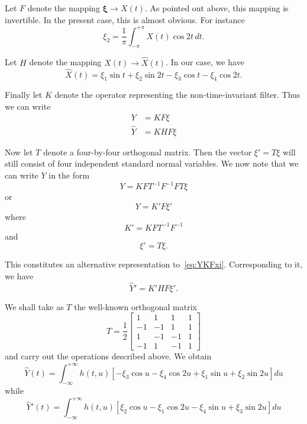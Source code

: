 \documentclass{article}
\begin{document}
Let $F$ denote the mapping $\boldsymbol{\xi} \rightarrow X(t)$. As pointed out above, this mapping is invertible. In the present case, this is almost obvious. For instance
\begin{equation}
\xi_2 = \frac{1}{\pi} \int_{-\pi}^{+\pi} X(t) \cos 2t\, dt.
\label{eq:xi2}
\end{equation}

Let $H$ denote the mapping $X(t) \rightarrow \hat{X}(t)$. In our case, we have
\begin{equation}
\hat{X}(t) = \xi_1 \sin t + \xi_2 \sin 2t - \xi_3 \cos t - \xi_4 \cos 2t.
\label{eq:Xhatcounter}
\end{equation}

Finally let $K$ denote the operator representing the non-time-invariant filter. Thus we can write
\begin{align}
Y &= K F \xi \label{eq:YKFxi} \\
\hat{Y} &= K H F \xi \label{eq:YKHFXI}
\end{align}

Now let $T$ denote a four-by-four orthogonal matrix. Then the vector $\xi' = T \xi$ will still consist of four independent standard normal variables. We now note that we can write $Y$ in the form
\begin{equation}
Y = K F T^{-1} F^{-1} F T \xi
\label{eq:Yaltform1}
\end{equation}
or
\begin{equation}
Y = K' F \xi'
\label{eq:Yaltform2}
\end{equation}
where
\begin{equation}
K' = K F T^{-1} F^{-1}
\label{eq:Kprime}
\end{equation}
and
\begin{equation}
\xi' = T \xi.
\label{eq:xiprime}
\end{equation}

This constitutes an alternative representation to~\eqref{eq:YKFxi}. Corresponding to it, we have
\begin{equation}
\hat{Y}' = K' H F \xi'.
\label{eq:Yhatprime}
\end{equation}

We shall take as $T$ the well-known orthogonal matrix
\begin{equation}
T = \frac{1}{2}
\begin{bmatrix}
1 & 1 & 1 & 1 \\
-1 & -1 & 1 & 1 \\
1 & -1 & -1 & 1 \\
-1 & 1 & -1 & 1
\end{bmatrix}
\label{eq:Tmatrix}
\end{equation}
and carry out the operations described above. We obtain
\begin{equation}
\hat{Y}(t) = \int_{-\infty}^{+\infty} h(t, u) \left[-\xi_3 \cos u - \xi_4 \cos 2u + \xi_1 \sin u + \xi_2 \sin 2u\right] du
\label{eq:Yhatcounter}
\end{equation}
while
\begin{equation}
\hat{Y}'(t) = \int_{-\infty}^{+\infty} h(t, u) \left[\xi_2 \cos u - \xi_1 \cos 2u - \xi_4 \sin u + \xi_3 \sin 2u\right] du
\label{eq:Yhatprimecounter}
\end{equation}
\end{document}
